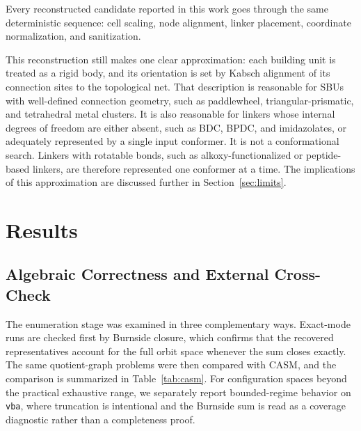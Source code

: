 \documentclass[pdflatex,sn-mathphys-num]{sn-jnl}
\theoremstyle{thmstyleone}%
\begin{document}
Every reconstructed candidate reported in this work goes through the same deterministic sequence: cell scaling, node alignment, linker placement, coordinate normalization, and sanitization.

This reconstruction still makes one clear approximation: each building unit is treated as a rigid body, and its orientation is set by Kabsch alignment of its connection sites to the topological net. That description is reasonable for SBUs with well-defined connection geometry, such as paddlewheel, triangular-prismatic, and tetrahedral metal clusters. It is also reasonable for linkers whose internal degrees of freedom are either absent, such as BDC, BPDC, and imidazolates, or adequately represented by a single input conformer. It is not a conformational search. Linkers with rotatable bonds, such as alkoxy-functionalized or peptide-based linkers, are therefore represented one conformer at a time. The implications of this approximation are discussed further in Section~\ref{sec:limits}.

\section*{Results}

\subsection*{Algebraic Correctness and External Cross-Check}
The enumeration stage was examined in three complementary ways. Exact-mode runs are checked first by Burnside closure, which confirms that the recovered representatives account for the full orbit space whenever the sum closes exactly. The same quotient-graph problems were then compared with CASM, and the comparison is summarized in Table~\ref{tab:casm}. For configuration spaces beyond the practical exhaustive range, we separately report bounded-regime behavior on \texttt{vba}, where truncation is intentional and the Burnside sum is read as a coverage diagnostic rather than a completeness proof.
\end{document}
